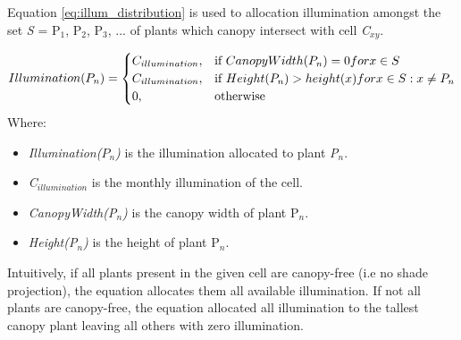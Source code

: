 Equation \ref{eq:illum_distribution} is used to allocation illumination amongst the set \textit{S} = {P$_{1}$, P$_{2}$, P$_{3}$, ...} of plants which canopy intersect with cell \textit{C$_{xy}$}.

\begin{equation}
\centering
Illumination(P_{n}) = 
\begin{cases}
	C_{illumination}, & \text{if } CanopyWidth(P_{n}) = 0 for x \in S \\
	C_{illumination}, & \text{if } Height(P_{n}) > height(x) for x \in S : x \neq P_{n} \\
    0,              & \text{otherwise}
\end{cases}
\label{eq:illum_distribution}
\end{equation}
Where:
\begin{itemize}
\item \textit{Illumination($P_{n}$)} is the illumination allocated to plant \textit{P$_{n}$}.
\item \textit{C$_{illumination}$} is the monthly illumination of the cell.
\item \textit{CanopyWidth(P$_{n}$)} is the canopy width of plant P$_{n}$.
\item \textit{Height(P$_{n}$)} is the height of plant P$_{n}$.
\end{itemize}

Intuitively, if all plants present in the given cell are canopy-free (i.e no shade projection), the equation allocates them all available illumination. If not all plants are canopy-free, the equation allocated all illumination to the tallest canopy plant leaving all others with zero illumination.


